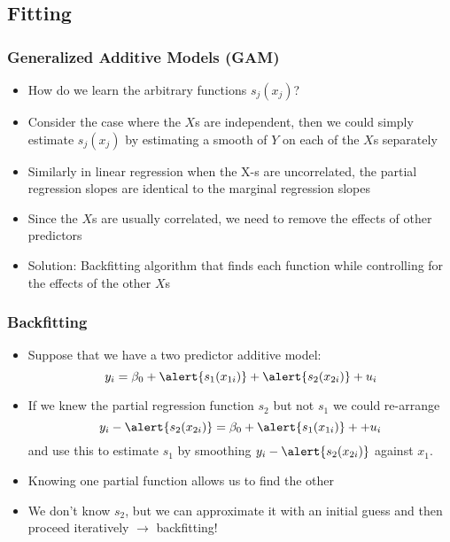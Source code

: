 \documentclass{beamer}
\numberwithin{equation}{section}
\begin{document}
\subsection{Fitting}


 \begin{frame}[fragile]
\frametitle{Generalized Additive Models (GAM)}
\small
\begin{itemize}
  \item How do we learn the arbitrary functions $s_j(x_{j}) $?
  \item Consider the case where the $X$s are independent, then we could simply estimate $s_j(x_{j}) $ by estimating a smooth of $Y$ on each of the $X$s separately
  \item Similarly in linear regression when the X-s are uncorrelated, the partial regression slopes are identical to the marginal regression slopes
  \item Since the $X$s are usually correlated, we need to remove the effects of other predictors
  \item  Solution: Backfitting algorithm that finds each function while controlling for the effects of the other $X$s
\end{itemize}
\end{frame}


 \begin{frame}[fragile]
\frametitle{Backfitting}
\small
\begin{itemize}
  \item Suppose that we have a two predictor additive model:$$
y_i = \beta_0 + \alert{s_1(x_{1i})} + \alert{s_2(x_{2i})}  + u_i
$$
\item If we knew the partial regression function $s_2$ but not $s_1$ we could re-arrange
$$
y_i - \alert{s_2(x_{2i})} = \beta_0 + \alert{s_1(x_{1i})} +   + u_i
$$ and use this to estimate $s_1$ by smoothing $y_i - \alert{s_2(x_{2i})} $ against $x_1$.
\item Knowing one partial function allows us to find the other
\item We don't know $s_2$, but we can approximate it with an initial guess and then proceed iteratively $\rightarrow$ backfitting!
\end{itemize}
\end{frame}
\end{document}
